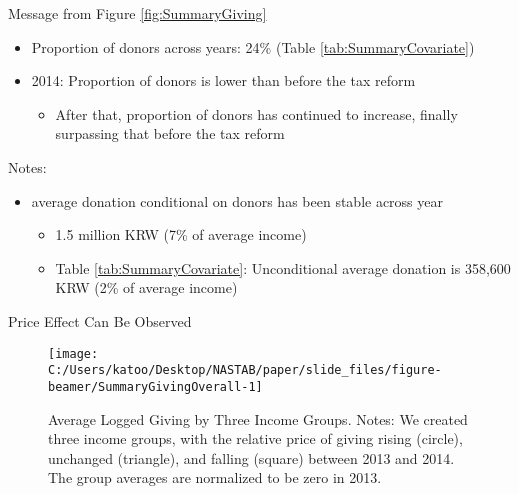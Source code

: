 \documentclass[
  ignorenonframetext,
  aspectratio=169,
]{beamer}
\providecommand{\tightlist}{%
  \setlength{\itemsep}{0pt}\setlength{\parskip}{0pt}}
\begin{document}
\begin{frame}{Message from Figure \ref{fig:SummaryGiving}}
\protect\hypertarget{message-from-figure-reffigsummarygiving}{}
\begin{itemize}
\tightlist
\item
  Proportion of donors across years: 24\% (Table \ref{tab:SummaryCovariate})
\item
  2014: Proportion of donors is lower than before the tax reform

  \begin{itemize}
  \tightlist
  \item
    After that, proportion of donors has continued to increase, finally surpassing that before the tax reform
  \end{itemize}
\end{itemize}

Notes:

\begin{itemize}
\tightlist
\item
  average donation conditional on donors has been stable across year

  \begin{itemize}
  \tightlist
  \item
    1.5 million KRW (7\% of average income)
  \item
    Table \ref{tab:SummaryCovariate}: Unconditional average donation is 358,600 KRW (2\% of average income)
  \end{itemize}
\end{itemize}
\end{frame}

\begin{frame}{Price Effect Can Be Observed}
\protect\hypertarget{price-effect-can-be-observed}{}
\begin{figure}[t]

{\centering \texttt{[image: C:/Users/katoo/Desktop/NASTAB/paper/slide\_files/figure-beamer/SummaryGivingOverall-1]} 

}

\caption{Average Logged Giving by Three Income Groups. Notes: We created three income groups, with the relative price of giving rising (circle), unchanged (triangle), and falling (square) between 2013 and 2014. The group averages are normalized to be zero in 2013.}\label{fig:SummaryGivingOverall}
\end{figure}
\end{frame}
\end{document}
